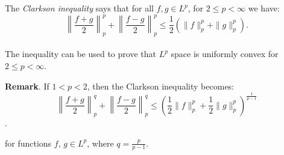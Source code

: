 \documentclass[12pt]{article}
\begin{document}
The \emph{Clarkson inequality} says that for all $f,g \in L^p$, for $2\leq p<\infty$  we have:
\[
\left\| \frac{f+g}{2} \right\|^p_p +
\left\| \frac{f-g}{2} \right\|^p_p
                                     \le
\frac{1}{2}\left( \|f\|^p_p + \|g\|^p_p\right).
\]
\\The inequality can be used to prove that $L^p$ space is uniformly convex for $2\leq p<\infty$.

\textbf{Remark}.
If $1 < p < 2$, then the Clarkson inequality becomes:
\[
\left\| \frac{f+g}{2} \right\|^q_p +
\left\| \frac{f-g}{2} \right\|^q_p
                                     \le
\left(\frac{1}{2} \|f\|^p_p +\frac{1}{2} \|g\|^p_p\right)^\frac{1}{p-1}
\].




for functions $f,\,g \in L^p$, where $q=\frac{p}{p-1}$.


\end{document}
